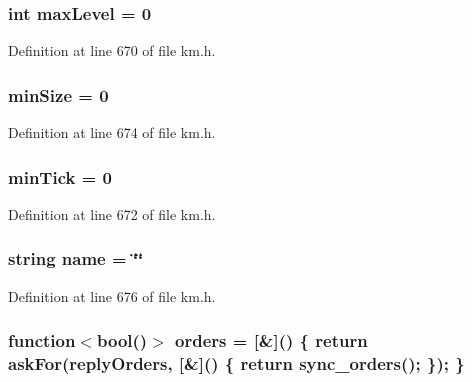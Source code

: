 \subsubsection[{\texorpdfstring{max\+Level}{maxLevel}}]{\setlength{\rightskip}{0pt plus 5cm}int max\+Level = 0}\hypertarget{class_k_1_1_gw_a8811afa719f86cb7ddde8770eb580fdc}{}\label{class_k_1_1_gw_a8811afa719f86cb7ddde8770eb580fdc}


Definition at line 670 of file km.\+h.

\subsubsection[{\texorpdfstring{min\+Size}{minSize}}]{ min\+Size = 0}\hypertarget{class_k_1_1_gw_a9814db79743d44d6def92893a4b43b84}{}\label{class_k_1_1_gw_a9814db79743d44d6def92893a4b43b84}


Definition at line 674 of file km.\+h.

\subsubsection[{\texorpdfstring{min\+Tick}{minTick}}]{ min\+Tick = 0}\hypertarget{class_k_1_1_gw_a86d946748d0cea5c3fb3ab8ae81cf23a}{}\label{class_k_1_1_gw_a86d946748d0cea5c3fb3ab8ae81cf23a}


Definition at line 672 of file km.\+h.

\subsubsection[{\texorpdfstring{name}{name}}]{\setlength{\rightskip}{0pt plus 5cm}string name = \char`\"{}\char`\"{}}\hypertarget{class_k_1_1_gw_a8ccf841cb59e451791bcb2e1ac4f1edc}{}\label{class_k_1_1_gw_a8ccf841cb59e451791bcb2e1ac4f1edc}


Definition at line 676 of file km.\+h.

\subsubsection[{\texorpdfstring{orders}{orders}}]{\setlength{\rightskip}{0pt plus 5cm}function$<$bool()$>$ orders = \mbox{[}\&\mbox{]}() \{ return {\bf ask\+For}({\bf reply\+Orders}, \mbox{[}\&\mbox{]}() \{ return {\bf sync\+\_\+orders}(); \}); \}}\hypertarget{class_k_1_1_gw_ab56786d35b5f78826316091dfb92b300}{}\label{class_k_1_1_gw_ab56786d35b5f78826316091dfb92b300}


